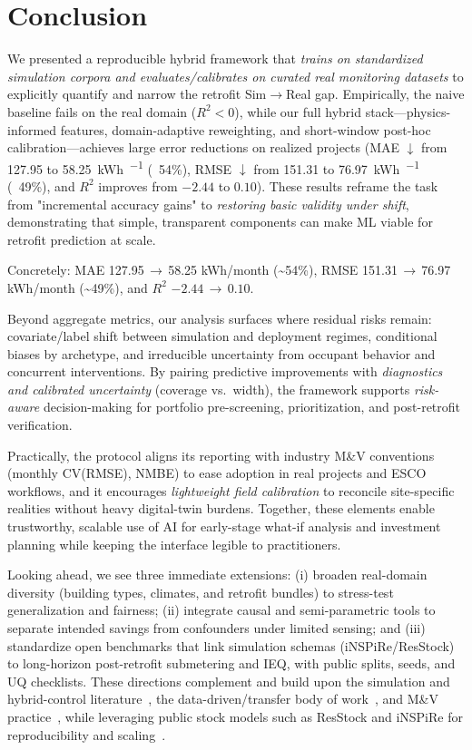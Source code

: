 ﻿\documentclass{article}
\begin{document}
\section{Conclusion}
We presented a reproducible hybrid framework that \emph{trains on standardized simulation corpora and evaluates/calibrates on curated real monitoring datasets} to explicitly quantify and narrow the retrofit Sim$\rightarrow$Real gap. Empirically, the naive baseline fails on the real domain ($R^2<0$), while our full hybrid stack---physics-informed features, domain-adaptive reweighting, and short-window post-hoc calibration---achieves large error reductions on realized projects (MAE $\downarrow$ from 127.95 to 58.25~\si{\kWh\per\month} (~54\%), RMSE $\downarrow$ from 151.31 to 76.97~\si{\kWh\per\month} (~49\%), and $R^2$ improves from $-2.44$ to $0.10$). These results reframe the task from "incremental accuracy gains" to \emph{restoring basic validity under shift}, demonstrating that simple, transparent components can make ML viable for retrofit prediction at scale.

Concretely: MAE 127.95\,$\rightarrow$\,58.25 kWh/month (\textasciitilde54\%), RMSE 151.31\,$\rightarrow$\,76.97 kWh/month (\textasciitilde49\%), and $R^2$ $-2.44\,\rightarrow\,0.10$.

Beyond aggregate metrics, our analysis surfaces where residual risks remain: covariate/label shift between simulation and deployment regimes, conditional biases by archetype, and irreducible uncertainty from occupant behavior and concurrent interventions. By pairing predictive improvements with \emph{diagnostics and calibrated uncertainty} (coverage vs.\ width), the framework supports \emph{risk-aware} decision-making for portfolio pre-screening, prioritization, and post-retrofit verification.

Practically, the protocol aligns its reporting with industry M\&V conventions (monthly CV(RMSE), NMBE) to ease adoption in real projects and ESCO workflows, and it encourages \emph{lightweight field calibration} to reconcile site-specific realities without heavy digital-twin burdens. Together, these elements enable trustworthy, scalable use of AI for early-stage what-if analysis and investment planning while keeping the interface legible to practitioners.

Looking ahead, we see three immediate extensions: (i) broaden real-domain diversity (building types, climates, and retrofit bundles) to stress-test generalization and fairness; (ii) integrate causal and semi-parametric tools to separate intended savings from confounders under limited sensing; and (iii) standardize open benchmarks that link simulation schemas (iNSPiRe/ResStock) to long-horizon post-retrofit submetering and IEQ, with public splits, seeds, and UQ checklists. These directions complement and build upon the simulation and hybrid-control literature~\citep{crawley2001energyplus,klein2017trnsys,wang2015modelica,drgona2020all,heinen2022flexibility}, the data-driven/transfer body of work~\citep{ahmad2017review,li2021review,hong2020transfer,mahnke2022transfer,li2022domain}, and M\&V practice~\citep{ashrae2014guideline,ipmvp2012}, while leveraging public stock models such as ResStock and iNSPiRe for reproducibility and scaling~\citep{resstock2017,wolf2014inspire}.
\end{document}
